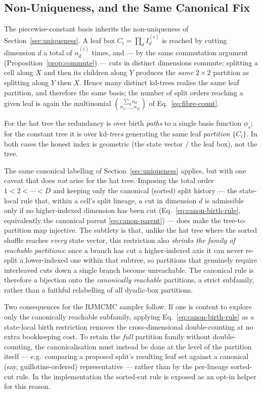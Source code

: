 \documentclass[11pt]{article}
\begin{document}
\subsection{Non-Uniqueness, and the Same Canonical Fix}
\label{sec:const-uniqueness}

The piecewise-constant basis inherits the non-uniqueness of
Section~\ref{sec:uniqueness}.  A leaf box $C_i=\prod_d I_d^{(i)}$ is reached by
cutting dimension $d$ a total of $n_d^{(i)}$ times, and --- by the same
commutation argument (Proposition~\ref{prop:commute}) --- cuts in distinct
dimensions commute: splitting a cell along $X$ and then its children along $Y$
produces the \emph{same} $2\times2$ partition as splitting along $Y$ then $X$.
Hence many distinct kd-trees realise the same leaf partition, and therefore the
same basis; the number of split orders reaching a given leaf is again the
multinomial $\binom{\sum_d n_d}{n_1,\dots,n_D}$ of Eq.~\eqref{eq:fibre-count}.

\begin{remark}
For the hat tree the redundancy is over birth \emph{paths} to a single
basis function $\phi_s$; for the constant tree it is over kd-\emph{trees}
generating the same leaf \emph{partition} $\{C_i\}$.  In both cases the honest
index is geometric (the state vector / the leaf box), not the tree.
\end{remark}

The same canonical labelling of Section~\ref{sec:uniqueness} applies, but with
one caveat that does \emph{not} arise for the hat tree.  Imposing the total order
$1<2<\cdots<D$ and keeping only the canonical (sorted) split history --- the
state-local rule that, within a cell's split lineage, a cut in dimension $d$ is
admissible only if no higher-indexed dimension has been cut
(Eq.~\eqref{eq:canon-birth-rule}, equivalently the canonical parent
\eqref{eq:canon-parent}) --- does make the tree-to-partition map injective.  The
subtlety is that, unlike the hat tree where the sorted shuffle reaches
\emph{every} state vector, this restriction also \emph{shrinks the family of
reachable partitions}: once a branch has cut a higher-indexed axis it can never
re-split a lower-indexed one within that subtree, so partitions that genuinely
require interleaved cuts down a single branch become unreachable.  The canonical
rule is therefore a bijection onto the \emph{canonically reachable} partitions, a
strict subfamily, rather than a faithful relabelling of all dyadic-box
partitions.

Two consequences for the RJMCMC sampler follow.  If one is content to explore
only the canonically reachable subfamily, applying
Eq.~\eqref{eq:canon-birth-rule} as a state-local birth restriction removes the
cross-dimensional double-counting at no extra bookkeeping cost.  To retain the
\emph{full} partition family without double-counting, the canonicalisation must
instead be done at the level of the partition itself --- e.g.\ comparing a
proposed split's resulting leaf set against a canonical (say, guillotine-ordered)
representative --- rather than by the per-lineage sorted-cut rule.  In the
implementation the sorted-cut rule is exposed as an opt-in helper for this
reason.
\end{document}
